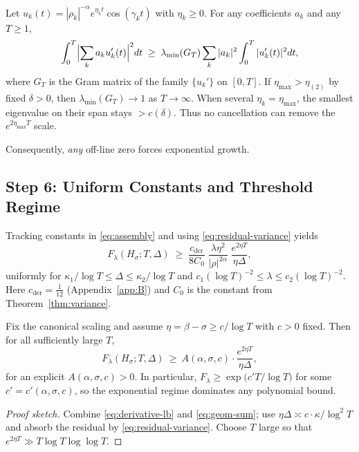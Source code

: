 \begin{lemma}\label{lem:no-cancel}
Let $u_k(t)=|\rho_k|^{-\alpha} e^{\eta_k t}\cos(\gamma_k t)$ with $\eta_k\ge 0$.
For any coefficients $a_k$ and any $T\ge1$,
\[
\int_0^T \Bigl|\sum_k a_k u_k'(t)\Bigr|^2 dt
\;\ge\; \lambda_{\min}(G_T)\sum_k |a_k|^2 \int_0^T |u_k'(t)|^2 dt,
\]
where $G_T$ is the Gram matrix of the family $\{u_k'\}$ on $[0,T]$.
If $\eta_{\max}>\eta_{(2)}$ by fixed $\delta>0$, then $\lambda_{\min}(G_T)\to1$ as $T\to\infty$.
When several $\eta_k=\eta_{\max}$, the smallest eigenvalue on their span stays $>c(\delta)$.
Thus no cancellation can remove the $e^{2\eta_{\max}T}$ scale.
\end{lemma}

\noindent
Consequently, \emph{any} off-line zero forces exponential growth.

\subsection{Step 6: Uniform Constants and Threshold Regime}\label{step:uniform}

Tracking constants in \eqref{eq:assembly} and using \eqref{eq:residual-variance} yields
\begin{equation}
F_\lambda(H_\sigma;T,\Delta)
 \;\ge\; \frac{c_{\mathrm{der}}}{8C_0}\;
 \frac{\lambda \eta^2}{|\rho|^{2\alpha}}\;
 \frac{e^{2\eta T}}{\eta\Delta},
\tag{8.7}\label{eq:uniform-lb}
\end{equation}
uniformly for $\kappa_1/\log T \le \Delta \le \kappa_2/\log T$ and
$c_1(\log T)^{-2}\le \lambda \le c_2(\log T)^{-2}$.
Here $c_{\mathrm{der}}=\tfrac1{12}$ (Appendix~\ref{app:B}) and $C_0$ is the constant from
Theorem~\ref{thm:variance}.

\begin{lemma}\label{lem:threshold}
Fix the canonical scaling and assume $\eta=\beta-\sigma \ge c/\log T$ with $c>0$ fixed.
Then for all sufficiently large $T$,
\[
F_\lambda(H_\sigma;T,\Delta)\ \ge\ 
A(\alpha,\sigma,c)\cdot \frac{e^{2\eta T}}{\eta \Delta},
\]
for an explicit $A(\alpha,\sigma,c)>0$.  In particular,
$F_\lambda\ge \exp\!\bigl(c' T/\log T\bigr)$ for some $c'=c'(\alpha,\sigma,c)$, so the
exponential regime dominates any polynomial bound.
\end{lemma}

\begin{proof}[Proof sketch]
Combine \eqref{eq:derivative-lb} and \eqref{eq:geom-sum}; use
$\eta\Delta\asymp c\cdot\kappa/\log^2 T$ and absorb the residual by \eqref{eq:residual-variance}.
Choose $T$ large so that $e^{2\eta T}\gg T\log T\log\log T$.
\end{proof}

